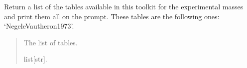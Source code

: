 \documentclass[letterpaper,10pt,english]{sphinxmanual}
\begin{document}
\begin{fulllineitems}
\label{\detokenize{source/api/setup_crust:nucleardatapy.crust.setup_crust.crust_models}}
\pysigstartsignatures
{}
\pysigstopsignatures
\sphinxAtStartPar
Return a list of the tables available in this toolkit for the experimental masses and
print them all on the prompt. These tables are the following
ones: ‘Negele\sphinxhyphen{}Vautheron\sphinxhyphen{}1973’.
\begin{quote}\begin{description}
\sphinxAtStartPar
The list of tables.

\sphinxAtStartPar
list{[}str{]}.

\end{description}\end{quote}

\end{fulllineitems}

\end{document}
